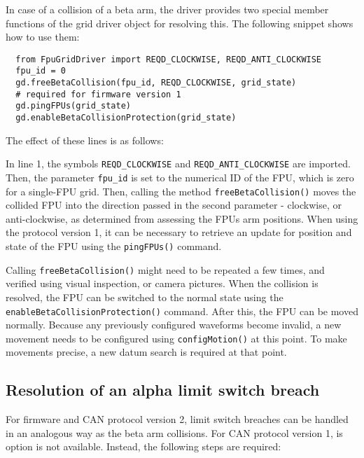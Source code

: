 \documentclass{scrartcl}[12pt,a4paper]
\begin{document}
In case of a collision of a beta arm, the driver provides two special
member functions of the grid driver object for resolving this. The
following snippet shows how to use them:

\begin{verbatim}
  from FpuGridDriver import REQD_CLOCKWISE, REQD_ANTI_CLOCKWISE
  fpu_id = 0
  gd.freeBetaCollision(fpu_id, REQD_CLOCKWISE, grid_state)
  # required for firmware version 1
  gd.pingFPUs(grid_state)
  gd.enableBetaCollisionProtection(grid_state)
\end{verbatim}

The effect of these lines is as follows:

In line 1, the symbols \texttt{REQD\_CLOCKWISE} and
\texttt{REQD\_ANTI\_CLOCKWISE} are imported.  Then, the parameter
\texttt{fpu\_id} is set to the numerical ID of the FPU, which is zero
for a single-FPU grid. Then, calling the method
\texttt{freeBetaCollision()} moves the collided FPU into the direction
passed in the second parameter - clockwise, or anti-clockwise, as
determined from assessing the FPUs arm positions. When using the
protocol version 1, it can be necessary to retrieve an update for
position and state of the FPU using the \texttt{pingFPUs()} command.

Calling \texttt{freeBetaCollision()} might need to be repeated a few
times, and verified using visual inspection, or camera pictures. When
the collision is resolved, the FPU can be switched to the normal state
using the \texttt{enableBetaCollisionProtection()} command.  After
this, the FPU can be moved normally. Because any previously configured
waveforms become invalid, a new movement needs to be configured using
\texttt{configMotion()} at this point. To make movements precise, a
new datum search is required at that point.

\subsection{Resolution of an alpha limit switch breach}

For firmware and CAN protocol  version 2, limit switch
breaches can be handled in an analogous way as the
beta arm collisions. For CAN protocol version 1,
is option is not available. Instead, the following
steps are required:
\end{document}
